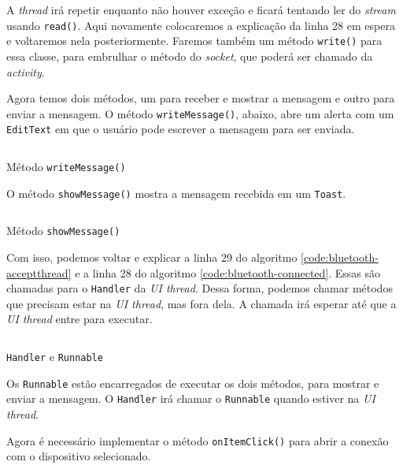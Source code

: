 \documentclass[a4paper,12pt,brazil]{book}
\begin{document}
\begin{singlespace}
	A \emph{thread} irá repetir enquanto não houver exceção e ficará tentando ler do \emph{stream} usando \texttt{read()}. Aqui novamente colocaremos a explicação da linha 28 em espera e voltaremos nela posteriormente. Faremos também um método \texttt{write()} para essa classe, para embrulhar o método do \emph{socket}, que poderá ser chamado da \emph{activity}.

	Agora temos dois métodos, um para receber e mostrar a mensagem e outro para enviar a mensagem. O método \texttt{writeMessage()}, abaixo, abre um alerta com um \texttt{EditText} em que o usuário pode escrever a mensagem para ser enviada.

	\begin{listing}[H]
	\inputminted[linenos=true,fontsize=\small,frame=lines, framesep=2mm, tabsize=2,numbersep=5pt]{java}{src/api/bluetooth/writemessage.java}
	\caption{Método \texttt{writeMessage()}}
	\label{code:bluetooth-writemessage}
	\end{listing} 	
	 
	O método \texttt{showMessage()} mostra a mensagem recebida em um \texttt{Toast}.

	\begin{listing}[H]
	\inputminted[linenos=true,fontsize=\small,frame=lines, framesep=2mm, tabsize=2,numbersep=5pt]{java}{src/api/bluetooth/showmessage.java}
	\caption{Método \texttt{showMessage()}}
	\label{code:bluetooth-showmessage}
	\end{listing} 	

	Com isso, podemos voltar e explicar a linha 29 do algoritmo \ref{code:bluetooth-acceptthread} e a linha 28 do algoritmo \ref{code:bluetooth-connected}. Essas são chamadas para o \texttt{Handler} da \emph{UI thread}. Dessa forma, podemos chamar métodos que precisam estar na \emph{UI thread}, mas fora dela. A chamada irá esperar até que a \emph{UI thread} entre para executar.

	\begin{listing}[H]
	\inputminted[linenos=true,fontsize=\small,frame=lines, framesep=2mm, tabsize=2,numbersep=5pt]{java}{src/api/bluetooth/handler.java}
	\caption{\texttt{Handler} e \texttt{Runnable}}
	\label{code:bluetooth-handler}
	\end{listing} 	

	Os \texttt{Runnable} estão encarregados de executar os dois métodos, para mostrar e enviar a mensagem. O \texttt{Handler} irá chamar o \texttt{Runnable} quando estiver na \emph{UI thread}.

	Agora é necessário implementar o método \texttt{onItemClick()} para abrir a conexão com o dispositivo selecionado.


\end{singlespace}
\end{document}
